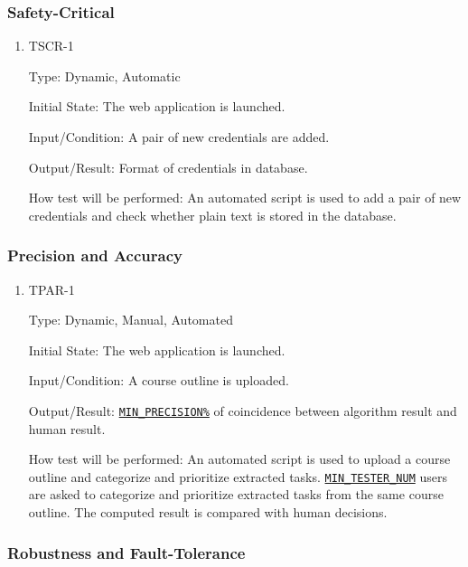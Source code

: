 \documentclass[12pt, titlepage]{article}
\begin{document}
\subsubsection{Safety-Critical}

\begin{enumerate}
\item{TSCR-1\\}\label{TSCR-1}

Type: Dynamic, Automatic
					
Initial State: The web application is launched.
					
Input/Condition: A pair of new credentials are added.
					
Output/Result: Format of credentials in database.
					
How test will be performed: An automated script is used to add a pair of new credentials and check whether plain text is stored in the database.

\end{enumerate}
\subsubsection{Precision and Accuracy}

\begin{enumerate}
\item{TPAR-1\\}\label{TPAR-1}

Type: Dynamic, Manual, Automated
					
Initial State: The web application is launched.
					
Input/Condition: A course outline is uploaded.
					
Output/Result: \hyperref[MIN_PRECISION]{\texttt{MIN\_PRECISION\%}} of coincidence between algorithm result and human result.
					
How test will be performed: An automated script is used to upload a course outline and categorize and prioritize extracted tasks. \hyperref[MIN_TESTER_NUM]{\texttt{MIN\_TESTER\_NUM}} users are asked to categorize and prioritize extracted tasks from the same course outline.  The computed result is compared with human decisions.

\end{enumerate}

\subsubsection{Robustness and Fault-Tolerance}
\end{document}
